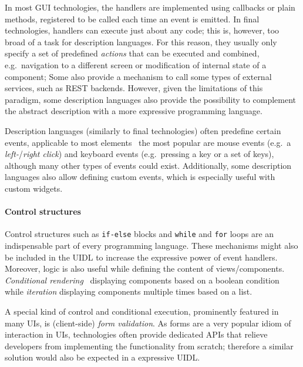 In most GUI technologies, the handlers are implemented using callbacks or plain methods, registered to be called each time an event is emitted.
In final technologies, handlers can execute just about any code; this is, however, too broad of a task for description languages.
For this reason, they usually only specify a set of predefined \emph{actions} that can be executed and combined, e.g.\ navigation to a different screen or modification of internal state of a component;
Some also provide a mechanism to call some types of external services, such as REST backends.
However, given the limitations of this paradigm, some description languages also provide the possibility to complement the abstract description with a more expressive programming language.


Description languages (similarly to final technologies) often predefine certain events, applicable to most elements \textendash\ the most popular are mouse events (e.g.\ a \emph{left-}/\emph{right click}) and keyboard events (e.g.\ pressing a key or a set of keys), although many other types of events could exist.
Additionally, some description languages also allow defining custom events, which is especially useful with custom widgets.

\paragraph{Control structures}
Control structures such as \texttt{if-else} blocks and \texttt{while} and \texttt{for} loops are an indispensable part of every programming language.
These mechanisms might also be included in the UIDL to increase the expressive power of event handlers.
Moreover, logic is also useful while defining the content of views/components.
\emph{Conditional rendering} \textendash\ displaying components based on a boolean condition while \emph{iteration} displaying components multiple times based on a list.

A special kind of control and conditional execution, prominently featured in many UIs, is (client-side) \emph{form validation}.
As forms are a very popular idiom of interaction in UIs, technologies often provide dedicated APIs that relieve developers from implementing the functionality from scratch;
therefore a similar solution would also be expected in a expressive UIDL\@.

